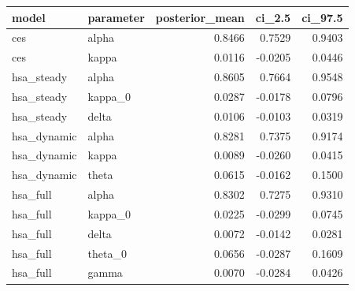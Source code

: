 \begin{tabular}{llrrr}
\toprule
model & parameter & posterior\_mean & ci\_2.5 & ci\_97.5 \\
\midrule
ces & alpha & 0.8466 & 0.7529 & 0.9403 \\
ces & kappa & 0.0116 & -0.0205 & 0.0446 \\
hsa\_steady & alpha & 0.8605 & 0.7664 & 0.9548 \\
hsa\_steady & kappa\_0 & 0.0287 & -0.0178 & 0.0796 \\
hsa\_steady & delta & 0.0106 & -0.0103 & 0.0319 \\
hsa\_dynamic & alpha & 0.8281 & 0.7375 & 0.9174 \\
hsa\_dynamic & kappa & 0.0089 & -0.0260 & 0.0415 \\
hsa\_dynamic & theta & 0.0615 & -0.0162 & 0.1500 \\
hsa\_full & alpha & 0.8302 & 0.7275 & 0.9310 \\
hsa\_full & kappa\_0 & 0.0225 & -0.0299 & 0.0745 \\
hsa\_full & delta & 0.0072 & -0.0142 & 0.0281 \\
hsa\_full & theta\_0 & 0.0656 & -0.0287 & 0.1609 \\
hsa\_full & gamma & 0.0070 & -0.0284 & 0.0426 \\
\bottomrule
\end{tabular}
